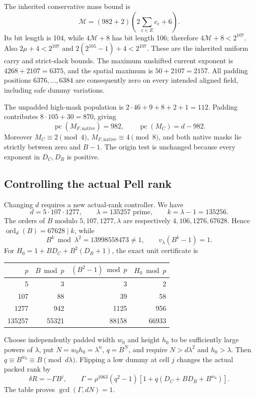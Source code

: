 The inherited conservative mass bound is
\[
 \mathcal M=(982+2)\left(2\sum_{e\in E}c_e+6\right).
\]
Its bit length is 104, while $4\mathcal M+8$ has bit length 106;
therefore $4\mathcal M+8<2^{107}$.  Also $2\mu+4<2^{107}$ and
$2(2^{105}-1)+4<2^{107}$.  These are the inherited uniform carry and
strict-slack bounds.  The maximum unshifted current exponent is
$4268+2107=6375$, and the spatial maximum is $50+2107=2157$.
All padding positions $6376,\ldots,6384$ are consequently zero on every
intended aligned field, including safe dummy variations.

The unpadded high-mask population is $2\cdot46+9+8+2+1=112$.
Padding contributes $8\cdot105+30=870$, giving
\[
 \operatorname{pc}(M_{F,\mathrm{native}})=982,\qquad
 \operatorname{pc}(M_C)=d-982.
\]
Moreover $M_C\equiv2\pmod4$, $M_{F,\mathrm{native}}\equiv4\pmod8$,
and both native masks lie strictly between zero and $B-1$.  The origin
test is unchanged because every exponent in $D_C,D_R$ is positive.

\subsection{Controlling the actual Pell rank}

Changing $d$ requires a new actual-rank controller.  We have
\[
 d=5\cdot107\cdot1277,
 \qquad \lambda=135257\text{ prime},\qquad k=\lambda-1=135256.
\]
The orders of $B$ modulo $5,107,1277,\lambda$ are respectively
$4,106,1276,67628$.  Hence
$\operatorname{ord}_d(B)=67628\mid k$, while
\[
 B^k\bmod\lambda^2=13998558473\ne1,
 \qquad v_\lambda(B^k-1)=1.
\]
For $H_0=1+BD_C+B^2(D_R+1)$, the exact unit certificate is
\begin{center}
\begin{tabular}{rrrr}
\hline
$p$ & $B\bmod p$ & $(B^2-1)\bmod p$ & $H_0\bmod p$\\
\hline
5 & 3 & 3 & 2\\
107 & 88 & 39 & 58\\
1277 & 942 & 1125 & 956\\
135257 & 55321 & 88158 & 66933\\
\hline
\end{tabular}
\end{center}
Choose independently padded width $w_0$ and height $h_0$ to be
sufficiently large powers of $\lambda$, put $N=w_0h_0=\lambda^n$,
$q=B^N$, and require $N>d\lambda^2$ and $h_0>\lambda$.
Then $q\equiv B^{w_0}\equiv B\pmod{d\lambda}$.  Flipping a low
dummy at cell $j$ changes the actual packed rank by
\[
 \delta R=-\Gamma B^j,\qquad
 \Gamma=\rho^{1063}(q^2-1)
             [1+q(D_C+BD_R+B^{w_0})].
\]
The table proves $\gcd(\Gamma,dN)=1$.

